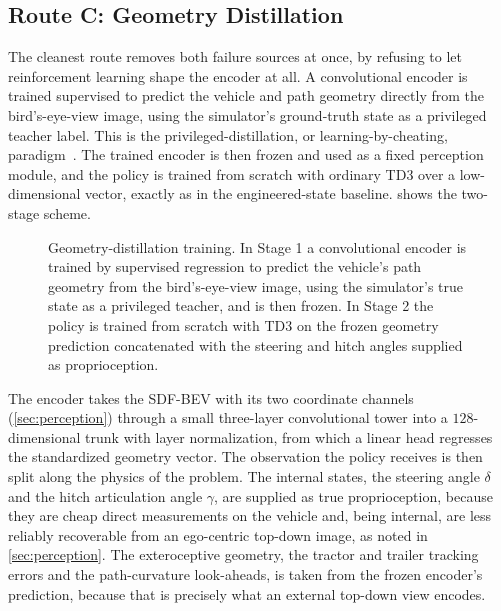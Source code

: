 \subsection{Route C: Geometry Distillation}
\label{sec:geometry_distillation}

The cleanest route removes both failure sources at once, by refusing to let reinforcement learning shape the encoder at all. A convolutional encoder is trained supervised to predict the vehicle and path geometry directly from the bird's-eye-view image, using the simulator's ground-truth state as a privileged teacher label. This is the privileged-distillation, or learning-by-cheating, paradigm~\cite{chen2020cheating}. The trained encoder is then frozen and used as a fixed perception module, and the policy is trained from scratch with ordinary TD3 over a low-dimensional vector, exactly as in the engineered-state baseline.  shows the two-stage scheme.

\begin{figure}[t]
  \centering
  \resizebox{\textwidth}{!}{}
  \caption{Geometry-distillation training. In Stage 1 a convolutional encoder is trained by supervised regression to predict the vehicle's path geometry from the bird's-eye-view image, using the simulator's true state as a privileged teacher, and is then frozen. In Stage 2 the policy is trained from scratch with TD3 on the frozen geometry prediction concatenated with the steering and hitch angles supplied as proprioception.}
  \label{fig:geometry_distillation}
\end{figure}

The encoder takes the SDF-BEV with its two coordinate channels (\cref{sec:perception}) through a small three-layer convolutional tower into a $128$-dimensional trunk with layer normalization, from which a linear head regresses the standardized geometry vector. The observation the policy receives is then split along the physics of the problem. The internal states, the steering angle $\delta$ and the hitch articulation angle $\gamma$, are supplied as true proprioception, because they are cheap direct measurements on the vehicle and, being internal, are less reliably recoverable from an ego-centric top-down image, as noted in \cref{sec:perception}. The exteroceptive geometry, the tractor and trailer tracking errors and the path-curvature look-aheads, is taken from the frozen encoder's prediction, because that is precisely what an external top-down view encodes.

